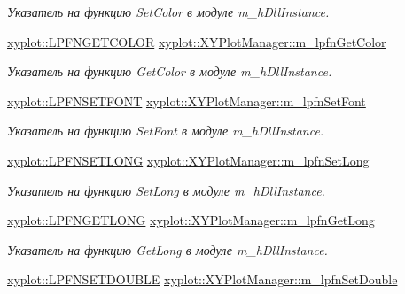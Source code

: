 \begin{DoxyCompactItemize}
\begin{DoxyCompactList}\small\item\em Указатель на функцию Set\-Color в модуле m\-\_\-h\-Dll\-Instance. \end{DoxyCompactList}\item 
\hyperlink{namespacexyplot_a0f7f51503a885f8e1b24c25973b1fc1d}{xyplot\-::\-L\-P\-F\-N\-G\-E\-T\-C\-O\-L\-O\-R} \hyperlink{group__gr_func_pointers_gaea89de1aabb85ec0bc1744be6c4b8c0e}{xyplot\-::\-X\-Y\-Plot\-Manager\-::m\-\_\-lpfn\-Get\-Color}
\begin{DoxyCompactList}\small\item\em Указатель на функцию Get\-Color в модуле m\-\_\-h\-Dll\-Instance. \end{DoxyCompactList}\item 
\hyperlink{namespacexyplot_a28e8fe476dccb830b8c9557e0f802263}{xyplot\-::\-L\-P\-F\-N\-S\-E\-T\-F\-O\-N\-T} \hyperlink{group__gr_func_pointers_ga20972e1ead3d8fc4ae624436c7c562e5}{xyplot\-::\-X\-Y\-Plot\-Manager\-::m\-\_\-lpfn\-Set\-Font}
\begin{DoxyCompactList}\small\item\em Указатель на функцию Set\-Font в модуле m\-\_\-h\-Dll\-Instance. \end{DoxyCompactList}\item 
\hyperlink{namespacexyplot_a6baf918a5bfe565a879b9d4fe5ef1124}{xyplot\-::\-L\-P\-F\-N\-S\-E\-T\-L\-O\-N\-G} \hyperlink{group__gr_func_pointers_gaaf490a07c7be98e17bef527c3f4f7403}{xyplot\-::\-X\-Y\-Plot\-Manager\-::m\-\_\-lpfn\-Set\-Long}
\begin{DoxyCompactList}\small\item\em Указатель на функцию Set\-Long в модуле m\-\_\-h\-Dll\-Instance. \end{DoxyCompactList}\item 
\hyperlink{namespacexyplot_a7fdb8fd61356e30fc76cd5a02266dbf7}{xyplot\-::\-L\-P\-F\-N\-G\-E\-T\-L\-O\-N\-G} \hyperlink{group__gr_func_pointers_gad700a337b94bdc880881e059f50c6169}{xyplot\-::\-X\-Y\-Plot\-Manager\-::m\-\_\-lpfn\-Get\-Long}
\begin{DoxyCompactList}\small\item\em Указатель на функцию Get\-Long в модуле m\-\_\-h\-Dll\-Instance. \end{DoxyCompactList}\item 
\hyperlink{namespacexyplot_acc2b15a223e822003ec2f51071dd16b2}{xyplot\-::\-L\-P\-F\-N\-S\-E\-T\-D\-O\-U\-B\-L\-E} \hyperlink{group__gr_func_pointers_ga1f974cec0445d2921f6e039830b27942}{xyplot\-::\-X\-Y\-Plot\-Manager\-::m\-\_\-lpfn\-Set\-Double}

\end{DoxyCompactItemize}
